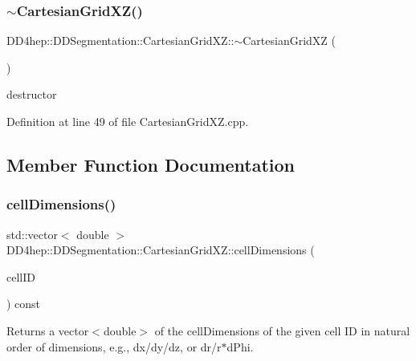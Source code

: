 \subsubsection{\texorpdfstring{$\sim$\+Cartesian\+Grid\+X\+Z()}{~CartesianGridXZ()}}
{\footnotesize\ttfamily D\+D4hep\+::\+D\+D\+Segmentation\+::\+Cartesian\+Grid\+X\+Z\+::$\sim$\+Cartesian\+Grid\+XZ (\begin{DoxyParamCaption}{ }\end{DoxyParamCaption})\hspace{0.3cm}{\ttfamily [virtual]}}



destructor 



Definition at line 49 of file Cartesian\+Grid\+X\+Z.\+cpp.



\subsection{Member Function Documentation}
\hypertarget{class_d_d4hep_1_1_d_d_segmentation_1_1_cartesian_grid_x_z_adfed73ee8d0122abe3dd014e6f14cfd3}{}\label{class_d_d4hep_1_1_d_d_segmentation_1_1_cartesian_grid_x_z_adfed73ee8d0122abe3dd014e6f14cfd3} 
\subsubsection{\texorpdfstring{cell\+Dimensions()}{cellDimensions()}}
{\footnotesize\ttfamily std\+::vector$<$ double $>$ D\+D4hep\+::\+D\+D\+Segmentation\+::\+Cartesian\+Grid\+X\+Z\+::cell\+Dimensions (\begin{DoxyParamCaption}\item[{const \hyperlink{namespace_d_d4hep_1_1_d_d_segmentation_ac7af071d85cb48820914434a07e21ba1}{Cell\+ID} \&}]{cell\+ID }\end{DoxyParamCaption}) const\hspace{0.3cm}{\ttfamily [virtual]}}



Returns a vector$<$double$>$ of the cell\+Dimensions of the given cell ID in natural order of dimensions, e.\+g., dx/dy/dz, or dr/r$\ast$d\+Phi. 

